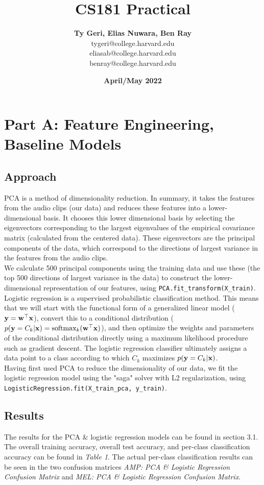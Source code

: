 \documentclass[11pt]{article}
\title{\textbf{CS181 Practical}}
\author{\textbf{Ty Geri, Elias Nuwara, Ben Ray} \\ tygeri@college.harvard.edu\\
eliasab@college.harvard.edu\\
benray@college.harvard.edu}
\date{\textbf{April/May 2022}}
\begin{document}
\maketitle{}

\section{Part A: Feature Engineering, Baseline Models}

\subsection{Approach}
PCA is a method of dimensionality reduction. In summary, it takes the features from the audio clips (our data) and reduces these features into a lower-dimensional basis. It chooses this lower dimensional basis by selecting the eigenvectors corresponding to the largest eigenvalues of the empirical covariance matrix (calculated from the centered data). These eigenvectors are the principal components of the data, which correspond to the directions of largest variance in the features from the audio clips.\\

\noindent We calculate 500 principal components using the training data and use these (the top 500 directions of largest variance in the data) to construct the lower-dimensional representation of our features, using \texttt{PCA.fit\_transform(X\_train)}.\\

\noindent Logistic regression is a supervised probabilistic classification method. This means that we will start with the functional form of a generalized linear model ($\mathbf{y} = \mathbf{w}^\top \mathbf{x}$), convert this to a conditional distribution ($p(\mathbf{y}=C_k | \mathbf{x}) = \text{softmax}_k(\mathbf{w}^\top \mathbf{x})$), and then optimize the weights and parameters of the conditional distribution directly using a maximum likelihood procedure such as gradient descent. The logistic regression classifier ultimately assigns a data point to a class according to which $C_k$ maximizes $p(\mathbf{y}=C_k | \mathbf{x})$.\\

\noindent Having first used PCA to reduce the dimensionality of our data, we fit the logistic regression model using the "saga" solver with L2 regularization, using \texttt{LogisticRegression.fit(X\_train\_pca, y\_train)}.

\subsection{Results}
The results for the PCA \& logistic regression models can be found in section 3.1. The overall training accuracy, overall test accuracy, and per-class classification accuracy can be found in \textit{Table 1}. The actual per-class classification results can be seen in the two confusion matrices \textit{AMP: PCA \& Logistic Regression Confusion Matrix} and \textit{MEL: PCA \& Logistic Regression Confusion Matrix}.\\
\end{document}
